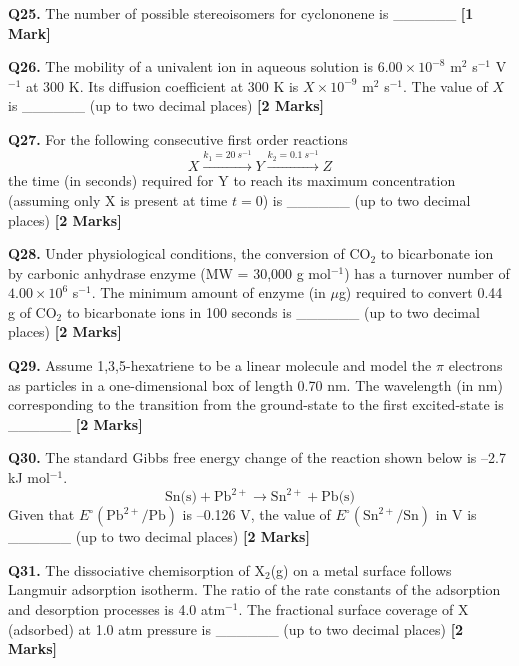 \documentclass[11pt]{article}
\newcommand{\questiona}[2]{
    \noindent\textbf{Q#2.} #1 \hfill \textbf{[1 Mark]}
}
\newcommand{\questionb}[2]{
    \noindent\textbf{Q#2.} #1 \hfill \textbf{[2 Marks]}
}
\begin{document}
\questiona{The number of possible stereoisomers for cyclononene is \_\_\_\_\_\_}{25}
\vspace{0.5cm}

\questionb{The mobility of a univalent ion in aqueous solution is \( 6.00 \times 10^{-8} \) m\(^2\) s\(^{-1}\) V\(^{-1}\) at 300 K. Its diffusion coefficient at 300 K is \( X \times 10^{-9} \) m\(^2\) s\(^{-1}\). The value of \( X \) is \_\_\_\_\_\_ (up to two decimal places)}{26}
\vspace{0.5cm}

\questionb{For the following consecutive first order reactions \[ X \xrightarrow{k_1=20~s^{-1}} Y \xrightarrow{k_2=0.1~s^{-1}} Z \] the time (in seconds) required for Y to reach its maximum concentration (assuming only X is present at time \( t = 0 \)) is \_\_\_\_\_\_ (up to two decimal places)}{27}
\vspace{0.5cm}

\questionb{Under physiological conditions, the conversion of CO\(_2\) to bicarbonate ion by carbonic anhydrase enzyme (MW = 30,000 g mol\(^{-1}\)) has a turnover number of \( 4.00 \times 10^6 \) s\(^{-1}\). The minimum amount of enzyme (in \(\mu\)g) required to convert 0.44 g of CO\(_2\) to bicarbonate ions in 100 seconds is \_\_\_\_\_\_ (up to two decimal places)}{28}
\vspace{0.5cm}

\questionb{Assume 1,3,5-hexatriene to be a linear molecule and model the \(\pi\) electrons as particles in a one-dimensional box of length 0.70 nm. The wavelength (in nm) corresponding to the transition from the ground-state to the first excited-state is \_\_\_\_\_\_}{29}
\vspace{0.5cm}

\questionb{The standard Gibbs free energy change of the reaction shown below is –2.7 kJ mol\(^{-1}\). \[ \text{Sn(s)} + \text{Pb}^{2+} \rightarrow \text{Sn}^{2+} + \text{Pb(s)} \] Given that \( E^\circ(\text{Pb}^{2+}/\text{Pb}) \) is –0.126 V, the value of \( E^\circ(\text{Sn}^{2+}/\text{Sn}) \) in V is \_\_\_\_\_\_ (up to two decimal places)}{30}
\vspace{0.5cm}

\questionb{The dissociative chemisorption of X\(_2\)(g) on a metal surface follows Langmuir adsorption isotherm. The ratio of the rate constants of the adsorption and desorption processes is 4.0 atm\(^{-1}\). The fractional surface coverage of X (adsorbed) at 1.0 atm pressure is \_\_\_\_\_\_ (up to two decimal places)}{31}
\vspace{0.5cm}
\end{document}
